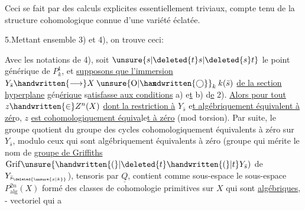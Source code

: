 Ceci se fait par des calculs explicites essentiellement triviaux, compte tenu de la structure cohomologique connue d'une variété éclatée.

5.\quad Mettant ensemble 3) et 4), on trouve ceci:

 Avec les notations de 4),  soit $\unsure{s|\deleted{t}s|\deleted{s}t}$ le point générique de $P^1_k$, et \uline{supposons que l'immersion} $Y_{\bar s}\handwritten{\longrightarrow}X\mathbin{\ooalign{\hfil$\mathrm{x}$\hfil\cr\hfil$\unsure{\mathrm{O}|\handwritten{\bigcirc}}$\hfil\cr}}_k k(\bar s)$ \uline{de la section hyperplane} gén\uline{érique}  s\uline{atisfasse aux conditions} a) e\uline{t} b) d\uline{e} 2). \uline{Alors pour tout} $z\handwritten{\in}Z^n(X)$ \uline{dont la restriction à} $Y_{\bar s}$ e\uline{t algébriquement équivalent à zér}o, $z$ \uline{est cohomologiquement équiva}le\uline{t à zéro} (mod torsion).  Par suite, le groupe quotient du groupe des cycles cohomologiquement équivalents à zéro  sur $Y_{\bar s}$, modulo ceux qui sont algébriquement équivalents à zéro (groupe qui mérite le nom de \uline{groupe de Griffiths} $\mathrm{Grif}\unsure{\handwritten{(}|\deleted{t}\handwritten{(}|t}Y_{\bar s})$ de $Y_{\bar s_{\deleted{\unsure{x|k}}}}$), tensoris par $\underline{Q}$, contient comme sous-espace le sous-espace $P^{2n}_{\mathrm{alg}}(X)$ formé des classes de cohomologie primitives sur $X$ qui sont \uline{algébriques}, - vectoriel qui a
